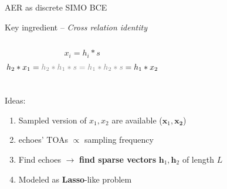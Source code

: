\begin{frame}{AER as discrete SIMO BCE}

    \begin{block}{Key ingredient -- \textit{Cross relation identity}}
        \begin{columns}[onlytextwidth]
            \[
                x_i = h_i \ast s
            \]
            \[
                h_2 \ast x_1 = \textcolor{gray}{h_2 \ast h_1 \ast s  = h_1 \ast h_2 \ast s} = h_1 \ast x_2
            \]

            \centering
        \end{columns}
    \end{block}

    \vspace*{-1em}

    \begin{block}{Ideas:}
    \begin{enumerate}
        \item Sampled version of $x_1,x_2$ are available ($\mathbf{x}_1, \mathbf{x_2}$)
        \item echoes' TOAs $\propto$ sampling frequency
        \item Find echoes $\rightarrow$ \textbf{find sparse vectors} $\mathbf{h}_1, \mathbf{h}_2$ of length $L$
        \item Modeled as \textbf{Lasso}-like problem


\end{enumerate}
\end{block}
\end{frame}
